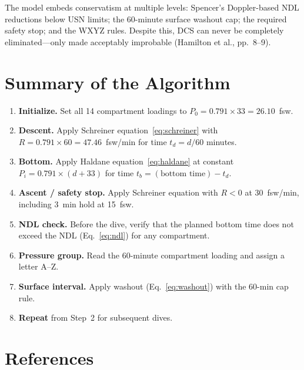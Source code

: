 \documentclass[11pt,letterpaper]{article}
\begin{document}
The model embeds conservatism at multiple levels: Spencer's Doppler-based
NDL reductions below USN limits; the 60-minute surface washout cap; the
required safety stop; and the WXYZ rules.  Despite this, DCS can never be
completely eliminated---only made acceptably improbable (Hamilton et al.,
pp.~8--9).


\section{Summary of the Algorithm}

\begin{enumerate}[label=\textbf{Step \arabic*:}]
  \item \textbf{Initialize.}  Set all 14 compartment loadings to
    $P_0 = 0.791 \times 33 = 26.10$~fsw.

  \item \textbf{Descent.}  Apply Schreiner equation~\eqref{eq:schreiner}
    with $R = 0.791 \times 60 = 47.46$~fsw/min for time
    $t_d = d/60$ minutes.

  \item \textbf{Bottom.}  Apply Haldane equation~\eqref{eq:haldane}
    at constant $P_i = 0.791 \times (d + 33)$ for time
    $t_b = (\text{bottom time}) - t_d$.

  \item \textbf{Ascent / safety stop.}  Apply Schreiner equation with
    $R < 0$ at 30~fsw/min, including 3~min hold at 15~fsw.

  \item \textbf{NDL check.}  Before the dive, verify that the planned
    bottom time does not exceed the NDL (Eq.~\ref{eq:ndl}) for any
    compartment.

  \item \textbf{Pressure group.}  Read the 60-minute compartment loading
    and assign a letter A--Z.

  \item \textbf{Surface interval.}  Apply washout (Eq.~\ref{eq:washout})
    with the 60-min cap rule.

  \item \textbf{Repeat} from Step~2 for subsequent dives.
\end{enumerate}


\section*{References}
\end{document}
